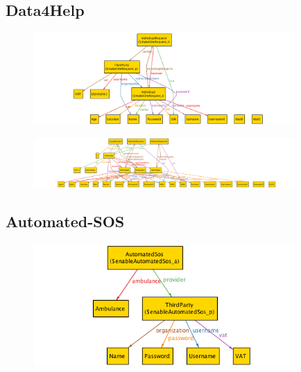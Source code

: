\documentclass[a4paper]{article}
\begin{document}
\subsection{Data4Help}
    
    
    
    
    \begin{figure}[!htpb]
    	\centering
    	\includegraphics[width=100mm]{images/alloy/makeOneRequest.png}
    \end{figure}
    
    
    
    \begin{figure}[!htpb]
    	\centering
    	\includegraphics[width=100mm]{images/alloy/Data4HelpComplete.png}
    \end{figure}

\subsection{Automated-SOS}
    
    
    
    
    \begin{figure}[!htpb]
    	\centering
    	\includegraphics[width=100mm]{images/alloy/enableAutomatedSos.png}
    \end{figure}
    
\end{document}
